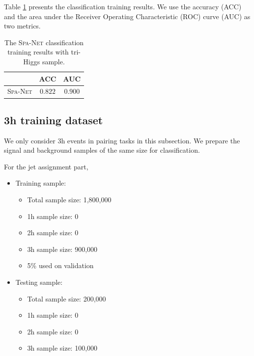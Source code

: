 \documentclass[12pt]{article}
\begin{document}
        Table \ref{tab:SPANet_triHiggs_0b_cls_classification_results} presents the classification training results. We use the accuracy (ACC) and the area under the Receiver Operating Characteristic (ROC) curve (AUC) as two metrics.
        \begin{table}[htpb]
            \centering
            \caption{The \textsc{Spa-Net} classification training results with tri-Higgs sample.}
            \label{tab:SPANet_triHiggs_0b_cls_classification_results}
            \begin{tabular}{c|cc}
                             & ACC     & AUC      \\ \hline
            \textsc{Spa-Net} & $0.822$ & $0.900 $
            \end{tabular}
        \end{table}
    \subsection{3h training dataset}%
    \label{sub:3h_training_dataset}
        We only consider 3h events in pairing tasks in this subsection. We prepare the signal and background samples of the same size for classification.

        For the jet assignment part,
        \begin{itemize}
            \item Training sample:
            \begin{itemize}
                \item Total sample size: 1,800,000
                \item 1h sample size: 0
                \item 2h sample size: 0
                \item 3h sample size: 900,000
                \item 5\% used on validation
            \end{itemize}
            \item Testing sample:
            \begin{itemize}
                \item Total sample size: 200,000
                \item 1h sample size: 0
                \item 2h sample size: 0
                \item 3h sample size: 100,000
            \end{itemize}
        \end{itemize}
\end{document}
